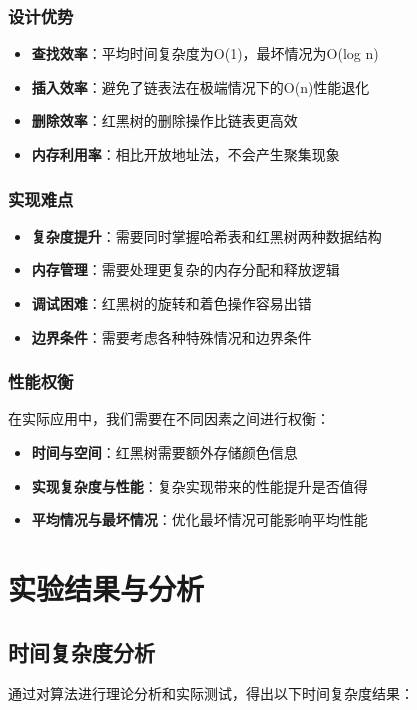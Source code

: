 \documentclass[12pt,a4paper]{article}
\begin{document}
\subsubsection{设计优势}
\begin{itemize}
\item \textbf{查找效率}：平均时间复杂度为O(1)，最坏情况为O(log n)
\item \textbf{插入效率}：避免了链表法在极端情况下的O(n)性能退化
\item \textbf{删除效率}：红黑树的删除操作比链表更高效
\item \textbf{内存利用率}：相比开放地址法，不会产生聚集现象
\end{itemize}

\subsubsection{实现难点}
\begin{itemize}
\item \textbf{复杂度提升}：需要同时掌握哈希表和红黑树两种数据结构
\item \textbf{内存管理}：需要处理更复杂的内存分配和释放逻辑
\item \textbf{调试困难}：红黑树的旋转和着色操作容易出错
\item \textbf{边界条件}：需要考虑各种特殊情况和边界条件
\end{itemize}

\subsubsection{性能权衡}
在实际应用中，我们需要在不同因素之间进行权衡：
\begin{itemize}
\item \textbf{时间与空间}：红黑树需要额外存储颜色信息
\item \textbf{实现复杂度与性能}：复杂实现带来的性能提升是否值得
\item \textbf{平均情况与最坏情况}：优化最坏情况可能影响平均性能
\end{itemize}

\section{实验结果与分析}

\subsection{时间复杂度分析}
通过对算法进行理论分析和实际测试，得出以下时间复杂度结果：
\end{document}
